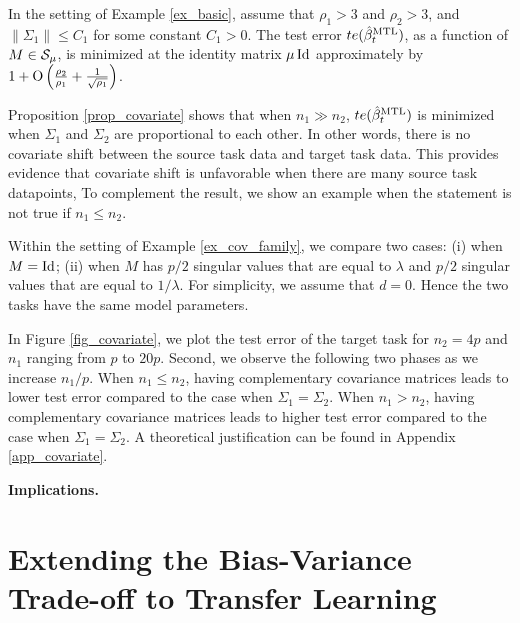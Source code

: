 \begin{proposition}\label{prop_covariate}
	In the setting of Example \ref{ex_basic}, assume that $\rho_1 > 3$ and $\rho_2>3$,
and $\|\Sigma_1\|\le C_1$ for some constant $C_1>0$. %
The test error $te(\hat{\beta}_t^{\text{MTL}})$, as a function of $M\in \mathcal{S}_{\mu}$, is minimized at the identity matrix $\mu\operatorname{Id}$ approximately by
$1+ \operatorname{O}\left(\frac{\rho_2}{\rho_1} + \frac{1}{\sqrt {\rho_1}}\right)$.
\end{proposition}
Proposition \ref{prop_covariate} shows that when $n_1\gg n_2$, $te(\hat{\beta}_t^{\text{MTL}})$ is minimized when $\Sigma_1$ and $\Sigma_2$ are proportional to each other.
In other words, there is no covariate shift between the source task data and target task data.
This provides evidence that covariate shift is unfavorable when there are many source task datapoints,
To complement the result, we show an example when the statement is not true if $n_1 \le n_2$.

\begin{example}\label{ex_complement}
	Within the setting of Example \ref{ex_cov_family}, we compare two cases: (i) when $M = \operatorname{Id}$; (ii) when $M$ has $p/2$ singular values that are equal to $\lambda$ and $p/2$ singular values that are equal to $1 / \lambda$.
	For simplicity, we assume that $d = 0$.
	Hence the two tasks have the same model parameters.

	In Figure \ref{fig_covariate}, we plot the test error of the target task for $n_2 = 4p$ and $n_1$ ranging from $p$ to $20p$.
	Second, we observe the following two phases as we increase $n_1 / p$.
	When $n_1 \le n_2$, having complementary covariance matrices leads to lower test error compared to the case when $\Sigma_1 = \Sigma_2$.
	When $n_1 > n_2$, having complementary covariance matrices leads to higher test error compared to the case when $\Sigma_1 = \Sigma_2$.
	A theoretical justification can be found in Appendix \ref{app_covariate}.
\end{example}


\textbf{Implications.}


\section{Extending the Bias-Variance Trade-off to Transfer Learning}\label{sec_taskonomy}

